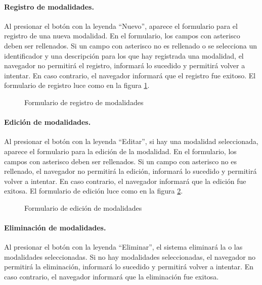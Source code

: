 \documentclass[a4paper, 9pt, conference]{article}              %
\begin{document}
\paragraph{Registro de modalidades.}

Al presionar el bot\'on con la leyenda ``Nuevo'', aparece el formulario para el registro de una nueva modalidad. En el formulario, los campos con asterisco deben ser rellenados. Si un campo con asterisco no es rellenado o se selecciona un identificador y una descripci\'on para los que hay registrada una modalidad, el navegador no permitir\'a el registro, informar\'a lo sucedido y permitir\'a volver a intentar. En caso contrario, el navegador informar\'a que el registro fue exitoso. El formulario de registro luce como en la figura \ref{fig:geoenrollmentmodesnew}.

\begin{figure}
	\centering
		\caption{Formulario de registro de modalidades}
	\label{fig:geoenrollmentmodesnew}
\end{figure}

\paragraph{Edici\'on de modalidades.}

Al presionar el bot\'on con la leyenda ``Editar'', si hay una modalidad seleccionada, aparece el formulario para la edici\'on de la modalidad. En el formulario, los campos con asterisco deben ser rellenados. Si un campo con asterisco no es rellenado, el navegador no permitir\'a la edici\'on, informar\'a lo sucedido y permitir\'a volver a intentar. En caso contrario, el navegador informar\'a que la edici\'on fue exitosa. El formulario de edici\'on luce como en la figura \ref{fig:geoenrollmentmodesedit}.

\begin{figure}
	\centering
		\caption{Formulario de edici\'on de modalidades}
	\label{fig:geoenrollmentmodesedit}
\end{figure}

\paragraph{Eliminaci\'on de modalidades.}

Al presionar el bot\'on con la leyenda ``Eliminar'', el sistema eliminar\'a la o las modalidades seleccionadas. Si no hay modalidades seleccionadas, el navegador no permitir\'a la eliminaci\'on, informar\'a lo sucedido y permitir\'a volver a intentar. En caso contrario, el navegador informar\'a que la eliminaci\'on fue exitosa.
\end{document}
